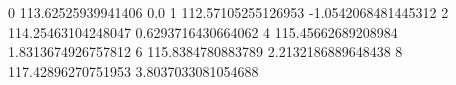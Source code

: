0 113.62525939941406 0.0
1 112.57105255126953 -1.0542068481445312
2 114.25463104248047 0.6293716430664062
4 115.45662689208984 1.8313674926757812
6 115.8384780883789 2.2132186889648438
8 117.42896270751953 3.8037033081054688
